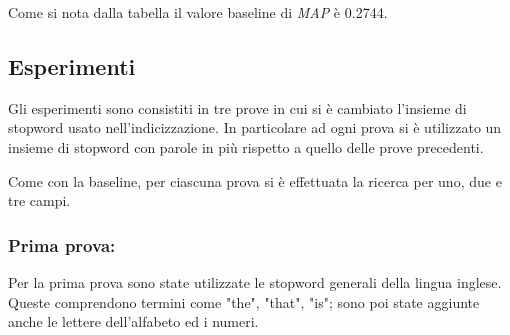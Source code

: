 \documentclass[runningheads]{llncs}
\begin{document}
Come si nota dalla tabella il valore baseline di \textit{MAP} \`e 0.2744.
\par

%
%
%
%



\vskip 1.5in

\subsection{Esperimenti}

Gli esperimenti sono consistiti in tre prove in cui si \`e cambiato l'insieme di stopword usato nell'indicizzazione. In particolare ad ogni prova si \`e utilizzato un insieme di stopword con parole in pi\`u rispetto a quello delle prove precedenti.

Come con la baseline, per ciascuna prova si \`e effettuata la ricerca per uno, due e tre campi.

\subsubsection{Prima prova:}

Per la prima prova sono state utilizzate le stopword generali della lingua inglese. Queste comprendono termini come "the", "that", "is"; sono poi state aggiunte anche le lettere dell'alfabeto ed i numeri.
\end{document}
